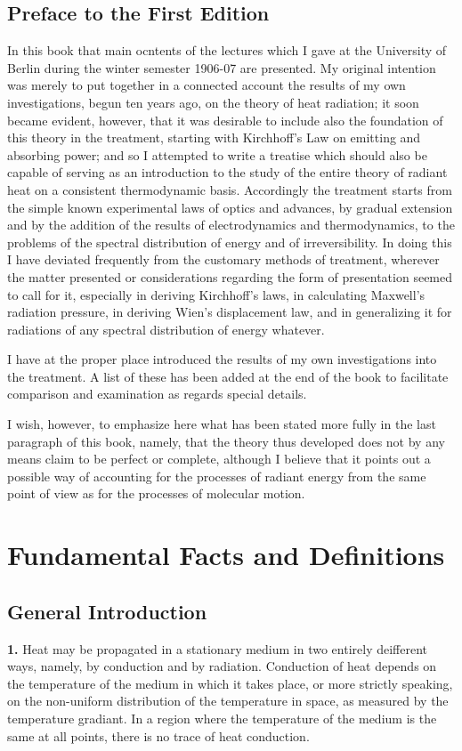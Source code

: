 \documentclass[12pt,oneside]{book}
\begin{document}
\chapter{Preface to the First Edition}
In this book that main ocntents of the lectures which I gave at the University of Berlin during the winter semester 1906-07 are presented. My original intention was merely to put together in a connected account the results of my own investigations, begun ten years ago, on the theory of heat radiation; it soon became evident, however, that it was desirable to include also the foundation of this theory in the treatment, starting with Kirchhoff's Law on emitting and absorbing power; and so I attempted to write a treatise which should also be capable of serving as an introduction to the study of the entire theory of radiant heat on a consistent thermodynamic basis. Accordingly the treatment starts from the simple known experimental laws of optics and advances, by gradual extension and by the addition of the results of electrodynamics and thermodynamics, to the problems of the spectral distribution of energy and of irreversibility. In doing this I have deviated frequently from the customary methods of treatment, wherever the matter presented or considerations regarding the form of presentation seemed to call for it, especially in deriving Kirchhoff's laws, in calculating Maxwell's radiation pressure, in deriving Wien's displacement law, and in generalizing it for radiations of any spectral distribution of energy whatever. \par 

I have at the proper place introduced the results of my own investigations into the treatment. A list of these has been added at the end of the book to facilitate comparison and examination as regards special details. \par 

I wish, however, to emphasize here what has been stated more fully in the last paragraph of this book, namely, that the theory thus developed does not by any means claim to be perfect or complete, although I believe that it points out a possible way of accounting for the processes of radiant energy from the same point of view as for the processes of molecular motion. \par 
\tableofcontents
\mainmatter
\part{Fundamental Facts and Definitions}
\chapter{General Introduction}
\textbf{1.} Heat may be propagated in a stationary medium in two entirely deifferent ways, namely, by conduction and by radiation. Conduction of heat depends on the temperature of the medium in which it takes place, or more strictly speaking, on the non-uniform distribution of the temperature in space, as measured by the temperature gradiant. In a region where the temperature of the medium is the same at all points, there is no trace of heat conduction. \par 
\end{document}
